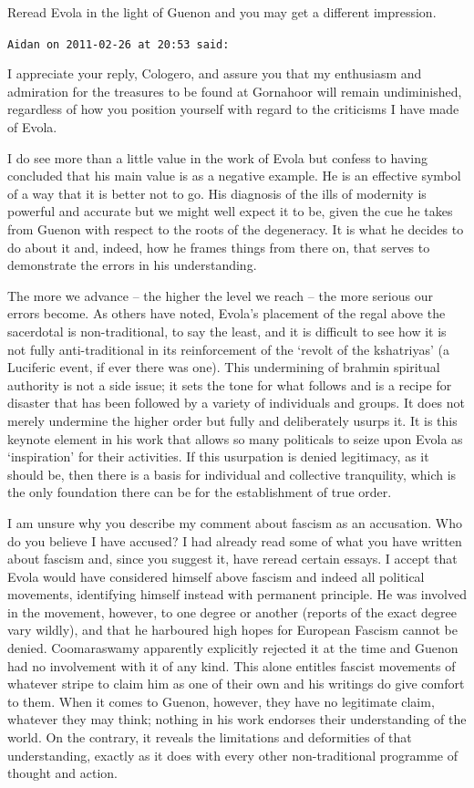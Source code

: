 \begin{footnotesize}
\begin{sffamily}
Reread Evola in the light of Guenon and you may get a different impression.

\hfill

\texttt{Aidan on 2011-02-26 at 20:53 said:}

I appreciate your reply, Cologero, and assure you that my enthusiasm and admiration for the treasures to be found at Gornahoor will remain undiminished, regardless of how you position yourself with regard to the criticisms I have made of Evola.

I do see more than a little value in the work of Evola but confess to having concluded that his main value is as a negative example. He is an effective symbol of a way that it is better not to go. His diagnosis of the ills of modernity is powerful and accurate but we might well expect it to be, given the cue he takes from Guenon with respect to the roots of the degeneracy. It is what he decides to do about it and, indeed, how he frames things from there on, that serves to demonstrate the errors in his understanding.

The more we advance -- the higher the level we reach -- the more serious our errors become. As others have noted, Evola's placement of the regal above the sacerdotal is non-traditional, to say the least, and it is difficult to see how it is not fully anti-traditional in its reinforcement of the `revolt of the kshatriyas' (a Luciferic event, if ever there was one). This undermining of brahmin spiritual authority is not a side issue; it sets the tone for what follows and is a recipe for disaster that has been followed by a variety of individuals and groups. It does not merely undermine the higher order but fully and deliberately usurps it. It is this keynote element in his work that allows so many politicals to seize upon Evola as `inspiration' for their activities. If this usurpation is denied legitimacy, as it should be, then there is a basis for individual and collective tranquility, which is the only foundation there can be for the establishment of true order.

I am unsure why you describe my comment about fascism as an accusation. Who do you believe I have accused? I had already read some of what you have written about fascism and, since you suggest it, have reread certain essays. I accept that Evola would have considered himself above fascism and indeed all political movements, identifying himself instead with permanent principle. He was involved in the movement, however, to one degree or another (reports of the exact degree vary wildly), and that he harboured high hopes for European Fascism cannot be denied. Coomaraswamy apparently explicitly rejected it at the time and Guenon had no involvement with it of any kind. This alone entitles fascist movements of whatever stripe to claim him as one of their own and his writings do give comfort to them. When it comes to Guenon, however, they have no legitimate claim, whatever they may think; nothing in his work endorses their understanding of the world. On the contrary, it reveals the limitations and deformities of that understanding, exactly as it does with every other non-traditional programme of thought and action.


\end{sffamily}
\end{footnotesize}
